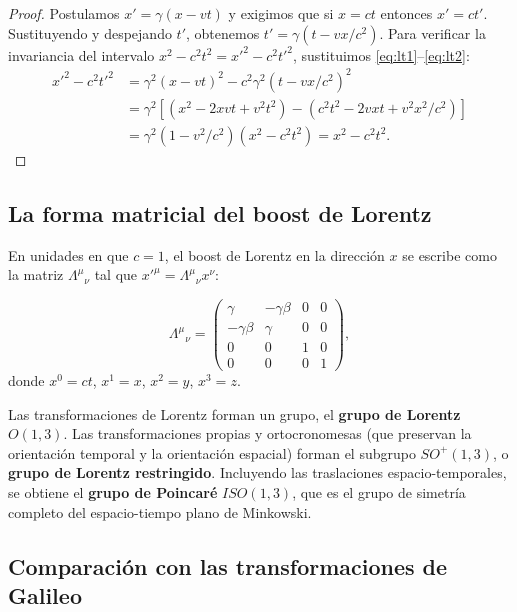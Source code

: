\begin{proof}
Postulamos $x' = \gamma(x - vt)$ y exigimos que si $x = ct$ entonces $x' = ct'$. Sustituyendo y despejando $t'$, obtenemos $t' = \gamma(t - vx/c^2)$. Para verificar la invariancia del intervalo $x^2 - c^2 t^2 = x'^2 - c^2 t'^2$, sustituimos \eqref{eq:lt1}--\eqref{eq:lt2}:
\begin{align*}
  x'^2 - c^2 t'^2
  &= \gamma^2(x-vt)^2 - c^2\gamma^2(t - vx/c^2)^2\\
  &= \gamma^2\!\left[(x^2 - 2xvt + v^2t^2) - (c^2t^2 - 2vxt + v^2x^2/c^2)\right]\\
  &= \gamma^2(1 - v^2/c^2)(x^2 - c^2t^2) = x^2 - c^2t^2.
\end{align*}
\end{proof}

\subsection{La forma matricial del boost de Lorentz}

En unidades en que $c = 1$, el boost de Lorentz en la dirección $x$ se escribe como la matriz $\Lambda^\mu{}_\nu$ tal que $x'^\mu = \Lambda^\mu{}_\nu x^\nu$:

\begin{equation}
  \Lambda^\mu{}_\nu =
  \begin{pmatrix}
    \gamma        & -\gamma\beta & 0 & 0 \\
    -\gamma\beta  & \gamma       & 0 & 0 \\
    0             & 0            & 1 & 0 \\
    0             & 0            & 0 & 1
  \end{pmatrix},
  \label{eq:lorentz_matrix}
\end{equation}
donde $x^0 = ct$, $x^1 = x$, $x^2 = y$, $x^3 = z$.

\begin{importante}
Las transformaciones de Lorentz forman un grupo, el \textbf{grupo de Lorentz} $O(1,3)$. Las transformaciones propias y ortocronomesas (que preservan la orientación temporal y la orientación espacial) forman el subgrupo $SO^+(1,3)$, o \textbf{grupo de Lorentz restringido}. Incluyendo las traslaciones espacio-temporales, se obtiene el \textbf{grupo de Poincaré} $ISO(1,3)$, que es el grupo de simetría completo del espacio-tiempo plano de Minkowski.
\end{importante}

\subsection{Comparación con las transformaciones de Galileo}

